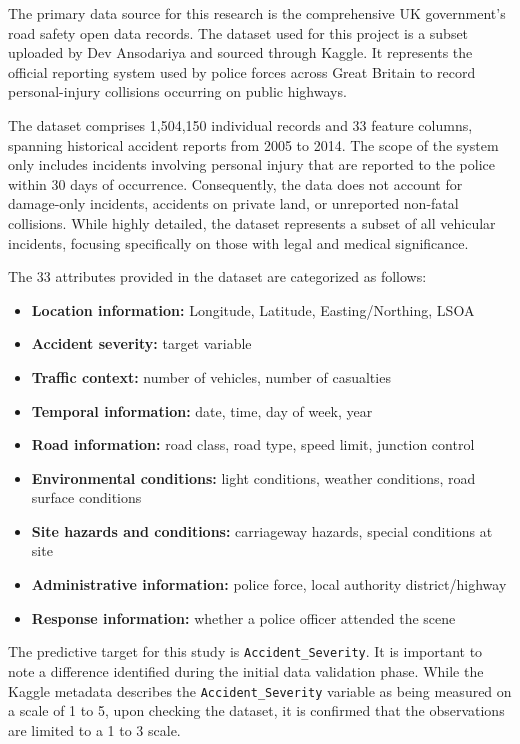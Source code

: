 The primary data source for this research is the comprehensive UK government's road safety open data records. The dataset used for this project is a subset uploaded by Dev Ansodariya and sourced through Kaggle. It represents the official reporting system used by police forces across Great Britain to record personal-injury collisions occurring on public highways.

The dataset comprises 1,504,150 individual records and 33 feature columns, spanning historical accident reports from 2005 to 2014. The scope of the system only includes incidents involving personal injury that are reported to the police within 30 days of occurrence. Consequently, the data does not account for damage-only incidents, accidents on private land, or unreported non-fatal collisions. While highly detailed, the dataset represents a subset of all vehicular incidents, focusing specifically on those with legal and medical significance.

The 33 attributes provided in the dataset are categorized as follows:
\begin{itemize}
    \item \textbf{Location information:} Longitude, Latitude, Easting/Northing, LSOA
    \item \textbf{Accident severity:} target variable
    \item \textbf{Traffic context:} number of vehicles, number of casualties
    \item \textbf{Temporal information:} date, time, day of week, year
    \item \textbf{Road information:} road class, road type, speed limit, junction control
    \item \textbf{Environmental conditions:} light conditions, weather conditions, road surface conditions
    \item \textbf{Site hazards and conditions:} carriageway hazards, special conditions at site
    \item \textbf{Administrative information:} police force, local authority district/highway
    \item \textbf{Response information:} whether a police officer attended the scene
\end{itemize}

The predictive target for this study is \texttt{Accident\_Severity}. It is important to note a difference identified during the initial data validation phase. While the Kaggle metadata describes the \texttt{Accident\_Severity} variable as being measured on a scale of 1 to 5, upon checking the dataset, it is confirmed that the observations are limited to a 1 to 3 scale.

